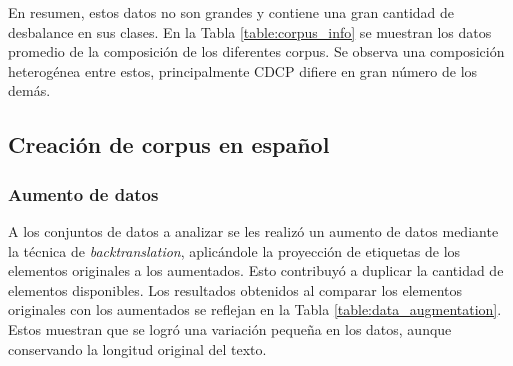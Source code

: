 \documentclass[a4paper,11pt,twocolumn,twoside]{article}
\begin{document}
En resumen, estos datos no son grandes y contiene una gran cantidad de desbalance en sus clases.
En la Tabla \ref{table:corpus_info} se muestran los datos promedio de la composición de los diferentes corpus. 
Se observa una composición heterogénea entre estos, principalmente CDCP difiere en gran número de los demás.

\begin{table}[h]
	\begin{center}
	\end{center}
	\caption{\label{table:corpus_info}Información de promedios de los conjuntos de datos.}
\end{table}
\subsection{Creación de corpus en español}

\subsubsection{Aumento de datos}

A los conjuntos de datos a analizar se les realizó un aumento de datos mediante la técnica de \textit{backtranslation},
aplicándole la proyección de etiquetas de los elementos originales a los aumentados.
Esto contribuyó a duplicar la cantidad de elementos disponibles. Los resultados obtenidos al comparar los 
elementos originales con los aumentados se reflejan en la Tabla \ref{table:data_augmentation}.
Estos muestran que se logró una variación pequeña en los datos, aunque conservando la 
longitud original del texto. 
\end{document}
